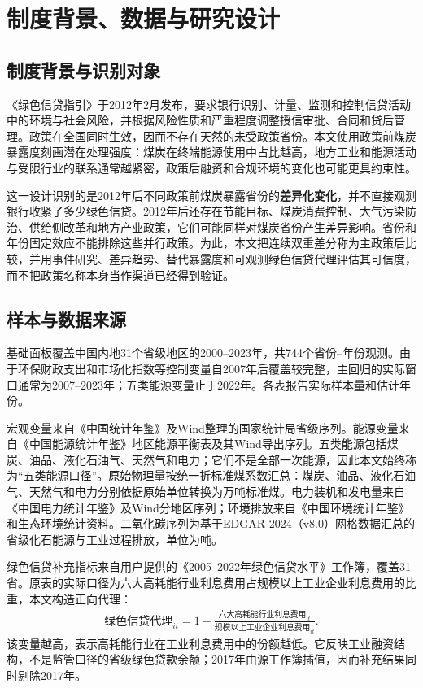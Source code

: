 \documentclass[UTF8,12pt]{ctexart}
\begin{document}
\section{制度背景、数据与研究设计}

\subsection{制度背景与识别对象}

《绿色信贷指引》于2012年2月发布，要求银行识别、计量、监测和控制信贷活动中的环境与社会风险，并根据风险性质和严重程度调整授信审批、合同和贷后管理\parencite{cbrc2012}。政策在全国同时生效，因而不存在天然的未受政策省份。本文使用政策前煤炭暴露度刻画潜在处理强度：煤炭在终端能源使用中占比越高，地方工业和能源活动与受限行业的联系通常越紧密，政策后融资和合规环境的变化也可能更具约束性。

这一设计识别的是2012年后不同政策前煤炭暴露省份的\textbf{差异化变化}，并不直接观测银行收紧了多少绿色信贷。2012年后还存在节能目标、煤炭消费控制、大气污染防治、供给侧改革和地方产业政策，它们可能同样对煤炭省份产生差异影响。省份和年份固定效应不能排除这些并行政策。为此，本文把连续双重差分称为主政策后比较，并用事件研究、差异趋势、替代暴露度和可观测绿色信贷代理评估其可信度，而不把政策名称本身当作渠道已经得到验证。

\subsection{样本与数据来源}

基础面板覆盖中国内地31个省级地区的2000--2023年，共744个省份--年份观测。由于环保财政支出和市场化指数等控制变量自2007年后覆盖较完整，主回归的实际窗口通常为2007--2023年；五类能源变量止于2022年。各表报告实际样本量和估计年份。

宏观变量来自《中国统计年鉴》及Wind整理的国家统计局省级序列。能源变量来自《中国能源统计年鉴》地区能源平衡表及其Wind导出序列。五类能源包括煤炭、油品、液化石油气、天然气和电力；它们不是全部一次能源，因此本文始终称为“五类能源口径”。原始物理量按统一折标准煤系数汇总：煤炭、油品、液化石油气、天然气和电力分别依据原始单位转换为万吨标准煤。电力装机和发电量来自《中国电力统计年鉴》及Wind分地区序列；环境排放来自《中国环境统计年鉴》和生态环境统计资料。二氧化碳序列为基于EDGAR 2024（v8.0）网格数据汇总的省级化石能源与工业过程排放，单位为吨\parencite{crippaetal2024}。

绿色信贷补充指标来自用户提供的《2005--2022年绿色信贷水平》工作簿，覆盖31省。原表的实际口径为六大高耗能行业利息费用占规模以上工业企业利息费用的比重，本文构造正向代理：
\begin{equation}
\begin{aligned}
\text{绿色信贷代理}_{it}
  =1-\frac{\text{六大高耗能行业利息费用}_{it}}
  {\text{规模以上工业企业利息费用}_{it}}.
\end{aligned}
\end{equation}
该变量越高，表示高耗能行业在工业利息费用中的份额越低。它反映工业融资结构，不是监管口径的省级绿色贷款余额；2017年由源工作簿插值，因而补充结果同时剔除2017年。
\end{document}
